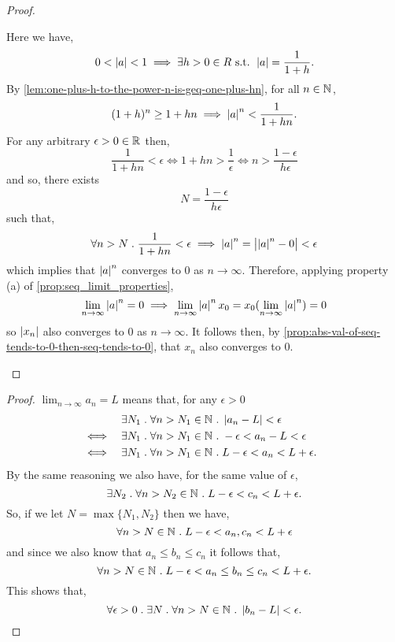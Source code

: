 \documentclass[../MathsNotesBase.tex]{subfiles}
\begin{document}
{\begin{proof}
\begin{enumerate}[label=(\roman*)]
{					Here we have,
					\[ 0 < \left\lvert a\right\rvert < 1 \implies \exists h > 0 \in R{} \text{ s.t. } \left\lvert a\right\rvert = \frac{1}{1 + h}. \]
					By \autoref{lem:one-plus-h-to-the-power-n-is-geq-one-plus-hn}, for all ${ n \in \mathbb{N}^{} }$,
					\[ (1 + h)^n \geq 1 + hn \implies \left\lvert a\right\rvert^n < \frac{1}{1 + hn}. \]
					For any arbitrary ${ \epsilon > 0 \in \mathbb{R}^{} }$ then,
					\[ \frac{1}{1 + hn} < \epsilon \iff 1 + hn > \frac{1}{\epsilon} \iff n > \frac{1 - \epsilon}{h\epsilon} \]
					and so, there exists 
					\[ N = \frac{1 - \epsilon}{h\epsilon} \]
					such that,
					\[ \forall n > N \;.\; \frac{1}{1 + hn} < \epsilon \implies \left\lvert a\right\rvert^n = \left\lvert\left\lvert a\right\rvert^n - 0\right\rvert < \epsilon \]
					which implies that $\left\lvert a\right\rvert^n$ converges to 0 as ${ n \to \infty }$. Therefore, applying property (a) of \autoref{prop:seq_limit_properties},
					\[ \lim_{n \to \infty} \left\lvert a\right\rvert^n = 0 \implies \lim_{n \to \infty} \left\lvert a\right\rvert^n x_0 = x_0 (\lim_{n \to \infty} \left\lvert a\right\rvert^n) = 0 \]
					so $\left\lvert x_n\right\rvert$ also converges to 0 as ${ n \to \infty }$. It follows then, by \autoref{prop:abs-val-of-seq-tends-to-0-then-seq-tends-to-0}, that $x_n$ also converges to 0.
				}
			\end{enumerate}
		\end{proof}
		

	
		\bigskip
		\begin{proof}
			${ \lim_{n \to \infty} a_n = L }$ means that, for any ${ \epsilon > 0 }$
			\begin{align*}
				&& \exists N_1 \;.\; \forall n > N_1 \in \mathbb{N}^{} &\;.\; \left\lvert a_n - L\right\rvert < \epsilon  &\text{\scriptsize{}} \\
				&\iff & \exists N_1 \;.\; \forall n > N_1 \in \mathbb{N}^{} &\;.\; -\epsilon < a_n - L < \epsilon  &\text{\scriptsize{}} \\
				&\iff & \exists N_1 \;.\; \forall n > N_1 \in \mathbb{N}^{} &\;.\; L - \epsilon < a_n < L + \epsilon.  &\text{\scriptsize{}}
			\end{align*}
			By the same reasoning we also have, for the same value of $\epsilon$,
			\[ \exists N_2 \;.\; \forall n > N_2 \in \mathbb{N}^{} \;.\; L - \epsilon < c_n < L + \epsilon. \]
			So, if we let ${ N = \max \{N_1, N_2\} }$ then we have,
			\[ \forall n > N \in \mathbb{N}^{} \;.\; L - \epsilon < a_n, c_n < L + \epsilon \]
			and since we also know that ${ a_n \leq b_n \leq c_n }$ it follows that,
			\[ \forall n > N \in \mathbb{N}^{} \;.\; L - \epsilon < a_n \leq b_n \leq c_n < L + \epsilon. \]
			This shows that,
			\[ \forall \epsilon > 0 \;.\; \exists N \;.\; \forall n > N \in \mathbb{N}^{} \;.\; \left\lvert b_n - L\right\rvert < \epsilon. \]
		\end{proof}

}
\end{document}
